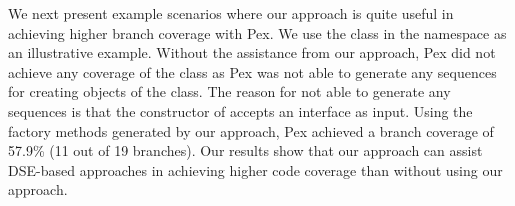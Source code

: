 We next present example scenarios where our approach is quite useful in achieving higher branch coverage with Pex. We use the   class in the  namespace as an illustrative example. Without the assistance from our approach, Pex did not achieve any coverage of the  class as Pex was not able to generate any sequences for creating objects of the  class. The reason for not able to generate any sequences is that the constructor of  accepts an interface as input. Using the factory methods generated by our approach, Pex achieved a branch coverage of 57.9\% (11 out of 19 branches). Our results show that our approach can assist DSE-based approaches in achieving higher code coverage than without using our approach.


